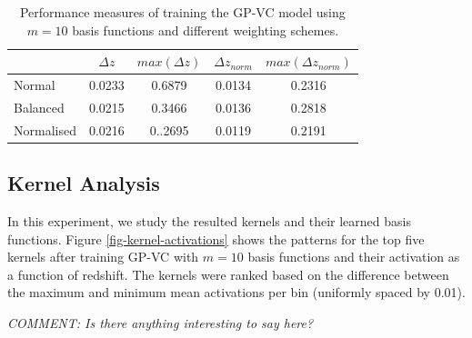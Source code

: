 \documentclass[useAMS,usenatbib,fleqn]{mn2e}
\begin{document}
 \begin{table}
\caption{Performance measures of training the GP-VC model using $m=10$ basis functions and different weighting schemes.}
\begin{center}
  \begin{tabular}{| l | c | c | c | c |}
     				&	$\Delta z$	&	$max(\Delta z)$		&	$\Delta z_{norm}$		&	$max(\Delta z_{norm})$	\\	\hline
	Normal		&	0.0233		&	0.6879				&	0.0134				&	0.2316					\\
	Balanced	&	0.0215		&	0.3466				&	0.0136				&	0.2818					\\
	Normalised	&	0.0216		&	0..2695				&	0.0119				&	0.2191					\\	\hline
  \end{tabular}
  \label{table-normal-balanced}
\end{center}
\end{table}

\subsection{Kernel Analysis}
In this experiment, we study the resulted kernels and their learned basis functions. Figure \ref{fig-kernel-activations} shows the patterns for the top five kernels after training GP-VC with $m=10$ basis functions and their activation as a function of redshift. The kernels were ranked based on the difference between the maximum and minimum mean activations per bin (uniformly spaced by 0.01).

\textit{COMMENT: Is there anything interesting to say here?}
\end{document}
